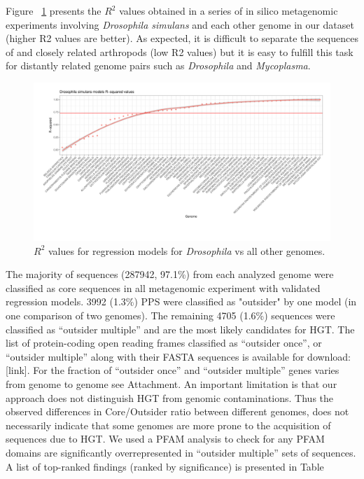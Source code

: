 Figure ~\ref{fig:rsquared_curve} presents the $R^2$ values obtained in a series
of in silico metagenomic experiments involving \textit{Drosophila simulans} and
each other genome in our dataset (higher R2 values are better). As expected, it
is difficult to separate the sequences of and closely related arthropods (low
R2 values) but it is easy to fulfill this task for distantly related genome
pairs such as \textit{Drosophila} and \textit{Mycoplasma}.
\begin{center}
\begin{figure}
\includegraphics[width=12cm]{figures/rsq_drosoph_bootstrapped.pdf}
\caption{$R^2$ values for regression models for \textit{Drosophila} vs all other
genomes.}
\label{fig:rsquared_curve}
\end{figure}
\end{center}
The majority of sequences (287942, 97.1\%) from each analyzed genome were
classified as core sequences in all metagenomic experiment with validated
regression models. 3992 (1.3\%) PPS were classified as "outsider" by one model
(in one comparison of two genomes).  The remaining 4705 (1.6\%) sequences were
classified as “outsider multiple” and are the most likely candidates for HGT.
The list of protein-coding open reading frames classified as “outsider once”,
or “outsider multiple” along with their FASTA sequences is available for
download: [link]. For the fraction of “outsider once” and “outsider multiple”
genes varies from genome to genome see Attachment. An important limitation is
that our approach does not distinguish HGT from genomic contaminations. Thus
the observed differences in Core/Outsider ratio between different genomes, does
not necessarily indicate that some genomes are more prone to the acquisition of
sequences due to HGT. We used a PFAM analysis to check for any PFAM domains are
significantly overrepresented in “outsider multiple” sets of sequences. A list
of top-ranked findings (ranked by significance) is presented in Table
